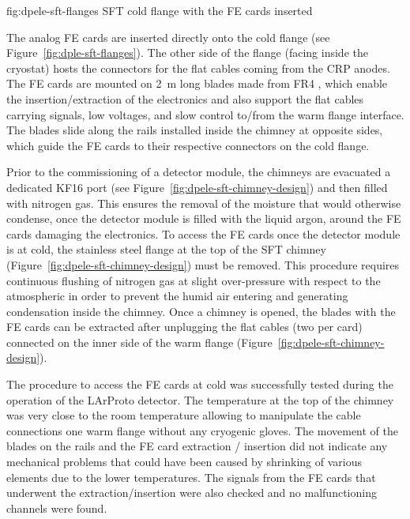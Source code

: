 \begin{dunefigure}{fig:dpele-sft-flanges}
{SFT cold flange with the FE cards inserted}
\end{dunefigure}

The analog FE cards are inserted directly onto the cold flange (see Figure~\ref{fig:dple-sft-flanges}). The other side of the flange (facing inside the cryostat) hosts the connectors for the flat cables coming from the CRP anodes.  The FE cards are mounted on \SI{2}{m} long blades made from FR4 , which enable the insertion/extraction of the electronics and also support the flat cables carrying signals, low voltages, and slow control to/from the warm flange interface.  The blades slide along the rails installed inside the chimney at opposite sides, which guide the FE cards to their respective connectors on the cold flange. 

Prior to the commissioning of a detector module, the chimneys are evacuated a dedicated KF16  port (see Figure~\ref{fig:dpele-sft-chimney-design}) and then filled with nitrogen gas. This ensures the removal of the moisture that would otherwise condense, once the detector module is filled with the liquid argon, around the FE cards damaging the electronics. To access the FE cards once the detector module is at cold, the stainless steel flange at the top of the SFT chimney (Figure~\ref{fig:dpele-sft-chimney-design}) must be removed. This procedure requires continuous flushing of nitrogen gas at slight over-pressure with respect to the atmospheric in order to prevent the humid air entering and generating condensation inside the chimney. Once a chimney is opened, the blades with the FE cards can be extracted after unplugging the flat cables (two per card) connected on the inner side of the warm flange (Figure~\ref{fig:dpele-sft-chimney-design}).

The procedure to access the FE cards at cold was successfully tested during the operation of the LArProto detector. The temperature at the top of the chimney was very close to the room temperature allowing to manipulate the cable connections one warm flange without any cryogenic gloves. The movement of the blades on the rails and the FE card extraction / insertion did not indicate any mechanical problems that could have been caused by shrinking of various elements due to the lower temperatures.  The signals from the FE cards that underwent the extraction/insertion were also checked and no malfunctioning channels were found.

